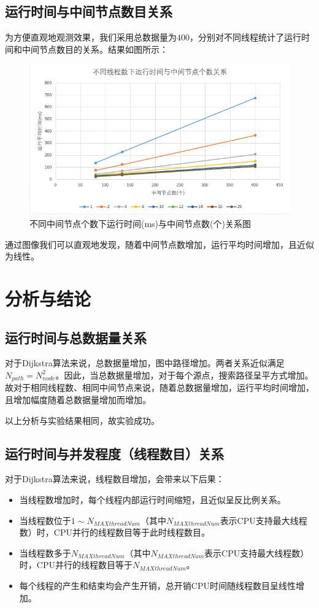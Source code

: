 \documentclass[UTF8]{ctexart}
\begin{document}
\subsection{运行时间与中间节点数目关系}
为方便直观地观测效果，我们采用总数据量为400，分别对不同线程统计了运行时间和中间节点数目的关系。结果如图所示：
\begin{figure}[H]
    \centering
    \includegraphics[scale=0.6]{T-N.png}
    \caption{不同中间节点个数下运行时间(ms)与中间节点数(个)关系图}
\end{figure}

通过图像我们可以直观地发现，随着中间节点数增加，运行平均时间增加，且近似为线性。

\section{分析与结论}
\subsection{运行时间与总数据量关系}
对于Dijkstra算法来说，总数据量增加，图中路径增加。两者关系近似满足$N_{path}=N_{node}^2$。因此，当总数据量增加，对于每个源点，搜索路径呈平方式增加。故对于相同线程数、相同中间节点来说，随着总数据量增加，运行平均时间增加，且增加幅度随着总数据量增加而增加。

以上分析与实验结果相同，故实验成功。
\subsection{运行时间与并发程度（线程数目）关系}
对于Dijkstra算法来说，线程数目增加，会带来以下后果：
\begin{itemize}
    \item 当线程数增加时，每个线程内部运行时间缩短，且近似呈反比例关系。
    \item 当线程数位于$1 \sim N_{MAXthreadNum}$（其中$N_{MAXthreadNum}$表示CPU支持最大线程数）时，CPU并行的线程数目等于此时线程数目。
    \item 当线程数多于$ N_{MAXthreadNum}$（其中$N_{MAXthreadNum}$表示CPU支持最大线程数）时，CPU并行的线程数目等于$N_{MAXthreadNum}$。
    \item 每个线程的产生和结束均会产生开销，总开销CPU时间随线程数目呈线性增加。
\end{itemize}
\end{document}
